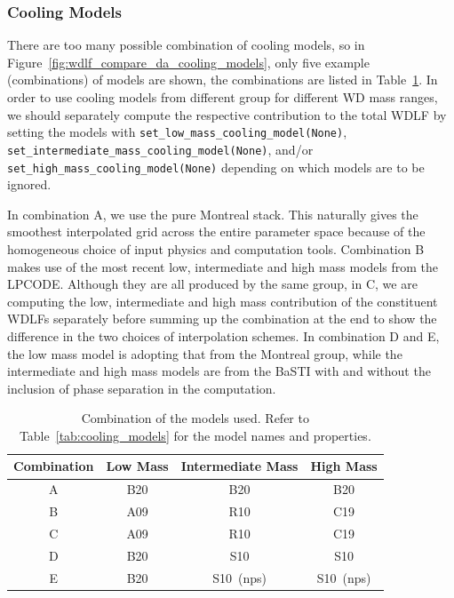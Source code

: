 \documentclass[fleqn,usenatbib]{rasti}
\begin{document}
\subsubsection{Cooling Models}
There are too many possible combination of cooling models, so in
Figure~\ref{fig:wdlf_compare_da_cooling_models}, only five example
(combinations) of models are shown, the combinations are listed in
Table~\ref{tab:cooling_model_combination}. In order to use cooling models from
different group for different WD mass ranges, we should separately compute the
respective contribution to the total WDLF by setting the models with
\texttt{set\_low\_mass\_cooling\_model(None)},
\texttt{set\_intermediate\_mass\_cooling\_model(None)}, and/or
\texttt{set\_high\_mass\_cooling\_model(None)} depending on which models are
to be ignored.

In combination A, we use the pure Montreal stack. This naturally gives the
smoothest interpolated grid across the entire parameter space because of the
homogeneous choice of input physics and computation tools. Combination B makes
use of the most recent low, intermediate and high mass models from the LPCODE.
Although they are all produced by the same group, in C, we are computing the
low, intermediate and high mass contribution of the constituent WDLFs
separately before summing up the combination at the end to show the difference
in the two choices of interpolation schemes. In combination D and E, the low
mass model is adopting that from the Montreal group, while the intermediate and
high mass models are from the BaSTI with and without the inclusion of phase
separation in the computation.

\begin{table}
    \centering
    \begin{tabular}{c|ccc}
        Combination & Low Mass & Intermediate Mass & High Mass \\ \hline\hline
        A     & B20      & B20               & B20 \\
        B     & A09      & R10               & C19 \\
        C     & A09      & R10               & C19 \\
        D     & B20      & S10               & S10 \\
        E     & B20      & S10~(nps)         & S10~(nps) \\
    \end{tabular}
    \caption{Combination of the models used. Refer to
    Table~\ref{tab:cooling_models} for the model names and properties.}
    \label{tab:cooling_model_combination}
\end{table}
\end{document}
